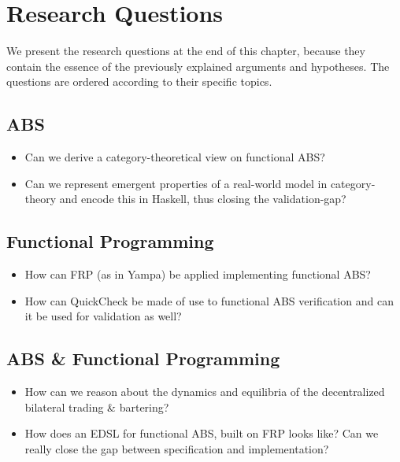 \section{Research Questions}
We present the research questions at the end of this chapter, because they contain the essence of the previously explained arguments and hypotheses. The questions are ordered according to their specific topics.

\subsection{ABS}
\begin{itemize}
	\item Can we derive a category-theoretical view on functional ABS? 
	\item Can we represent emergent properties of a real-world model in category-theory and encode this in Haskell, thus closing the validation-gap?
\end{itemize}

\subsection{Functional Programming}
\begin{itemize}
	\item How can FRP (as in Yampa) be applied implementing functional ABS?
	\item How can QuickCheck be made of use to functional ABS verification and can it be used for validation as well?
\end{itemize}

\subsection{ABS \& Functional Programming}
\begin{itemize}
	\item How can we reason about the dynamics and equilibria of the decentralized bilateral trading \& bartering?
	\item How does an EDSL for functional ABS, built on FRP looks like? Can we really close the gap between specification and implementation?
\end{itemize}